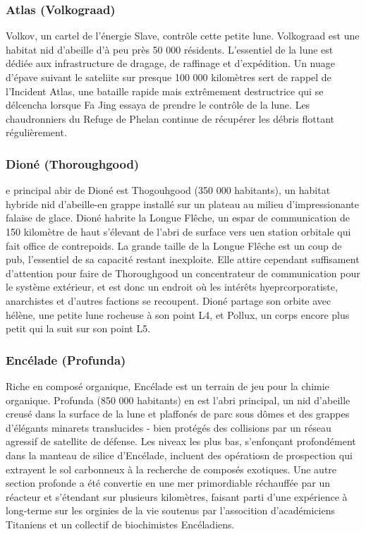 \subsubsection{Atlas (Volkograad)} \label{sec:atlas-volkograad} 

Volkov, un cartel de l'énergie Slave, contrôle cette petite lune. Volkograad est une habitat nid d'abeille d'à peu près 50 000 résidents. L'essentiel de la lune est dédiée aux infrastructure de dragage, de raffinage et d'expédition. Un nuage d'épave suivant le sateliite sur presque 100 000 kilomètres sert de rappel de l'Incident Atlas, une bataille rapide mais extrêmement destructrice qui se délcencha lorsque Fa Jing essaya de prendre le contrôle de la lune. Les chaudronniers du Refuge de Phelan continue de récupérer les débris flottant régulièrement. 

\subsubsection{Dioné (Thoroughgood)} \label{sec:dione-thoroughgood} 

e principal abir de Dioné est Thogouhgood (350 000 habitants), un habitat hybride nid d'abeille-en grappe installé sur un plateau au milieu d'impressionante falaise de glace. Dioné habrite la Longue Flêche, un espar de communication de 150 kilomètre de haut s'élevant de l'abri de surface vers uen station orbitale qui fait office de contrepoids. La grande taille de la Longue Flêche est un coup de pub, l'essentiel de sa capacité restant inexploite. Elle attire cependant suffisament d'attention pour faire de Thoroughgood un concentrateur de communication pour le système extérieur, et est donc un endroit où les intérêts hyeprcorporatiste, anarchistes et d'autres factions se recoupent. Dioné partage son orbite avec hélène, une petite  lune rocheuse à son point L4, et Pollux, un corps encore plus petit qui la suit sur son point L5. 

\subsubsection{Encélade (Profunda)} \label{sec:enceladus-profunda} 

Riche en composé organique, Encélade est un terrain de jeu pour la chimie organique. Profunda (850 000 habitants) en est l'abri principal, un nid d'abeille creusé dans la surface de la lune et plaffonés de parc sous dômes et des grappes d'élégants minarets translucides - bien protégés des collisions par un réseau agressif de satellite de défense. Les niveax les plus bas, s'enfonçant profondément dans la manteau de silice d'Encélade, incluent des opératiosn de prospection qui extrayent le sol carbonneux à la recherche de composés exotiques. Une autre section profonde a été convertie en une mer primordiable réchauffée par un réacteur et s'étendant sur plusieurs kilomètres, faisant parti d'une expérience à long-terme sur les orginies de la vie soutenus par l'assocition d'académiciens Titaniens et un collectif de biochimistes Encéladiens. 

